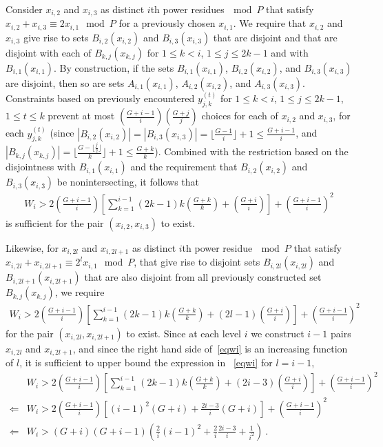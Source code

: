 \documentclass[12pt]{article} \pagestyle{plain} \topmargin
\begin{document}
Consider $x_{i,2}$ and $x_{i,3}$ as distinct $i$th power
residues$~\mod P$ that satisfy $x_{i,2}+ x_{i,3} \equiv 2x_{i,1}
\mod P$ for a previously chosen $x_{i,1}$. We require that
 $x_{i,2}$ and $x_{i,3}$ give rise to sets $B_{i,2}(x_{i,2})$ and
$B_{i,3}(x_{i,3})$ that are disjoint and that are disjoint with each
of $B_{k,j}(x_{k,j})$ for $1\leq k < i$, $1\leq j \leq 2k-1$ and
with $B_{i,1}(x_{i,1})$. By construction, if the sets
$B_{i,1}(x_{i,1})$, $B_{i,2}(x_{i,2})$, and $B_{i,3}(x_{i,3})$ are
disjoint, then so are sets $A_{i,1}(x_{i,1})$, $A_{i,2}(x_{i,2})$,
and $A_{i,3}(x_{i,3})$. Constraints based on previously encountered
$y_{j,k}^{(t)}$ for $1\leq k < i$, $1\leq j \leq 2k-1$, $1 \leq t
\leq k$ prevent at most $(\frac{G+i-1}{i})(\frac{G+j}{j})$ choices
for each of $x_{i,2}$ and $x_{i,3}$, for each $y_{j,k}^{(t)}$ (since
$|B_{i,2}(x_{i,2})|=|B_{i,3}(x_{i,3})|= \lfloor \frac{G-1}{i}
\rfloor+1 \leq \frac{G+i-1}{i}$, and $|B_{k,j}(x_{k,j})|=\lfloor
\frac{G-\lfloor \frac{j}{2}\rfloor}{k} \rfloor+1 \leq
\frac{G+k}{k}$). Combined with the restriction based on the
disjointness with $B_{i,1}(x_{i,1})$ and the requirement that
$B_{i,2}(x_{i,2})$ and $B_{i,3}(x_{i,3})$ be nonintersecting, it
follows that
\begin{equation}\begin{array}{lll} W_i>
2\left(\frac{G+i-1}{i}\right) \left[\sum_{k=1}^{i-1}
(2k-1)k(\frac{G+k}{k})+\left( \frac{G+i}{i}\right)\right]+\left(
\frac{G+i-1}{i}\right)^2
\end{array}\end{equation}
is sufficient for the pair $(x_{i,2},x_{i,3})$ to exist.

Likewise, for  $x_{i,2l}$ and $x_{i,2l+1}$ as distinct $i$th power
residue$~\mod P$ that satisfy $x_{i,2l}+ x_{i,2l+1} \equiv
2^lx_{i,1} \mod P$, that give rise to disjoint sets
$B_{i,2l}(x_{i,2l})$ and $B_{i,2l+1}(x_{i,2l+1})$ that are also
disjoint from all previously constructed set $B_{k,j}(x_{k,j})$,
we require
\begin{equation}\label{eqwi}\begin{array}{lll} W_i>
2(\frac{G+i-1}{i}) \left[\sum_{k=1}^{i-1}
(2k-1)k(\frac{G+k}{k})+(2l-1)\left(
\frac{G+i}{i}\right)\right]+\left( \frac{G+i-1}{i}\right)^2
\end{array}\end{equation}
for the pair $(x_{i,2l},x_{i,2l+1})$ to exist. Since at each level
$i$ we construct $i-1$ pairs $x_{i,2l}$ and $x_{i,2l+1}$, and since
the right hand side of~\eqref{eqwi} is an increasing function of
$l$, it is sufficient to upper bound the expression in ~\eqref{eqwi}
for $l=i-1$,
\begin{equation}\label{eqwi}\begin{array}{lll} {}&W_i>
2(\frac{G+i-1}{i}) \left[\sum_{k=1}^{i-1}
(2k-1)k(\frac{G+k}{k})+(2i-3)\left(
\frac{G+i}{i}\right)\right]+\left( \frac{G+i-1}{i}\right)^2\\
\Leftarrow & W_i > 2(\frac{G+i-1}{i}) \left[
(i-1)^2(G+i)+\frac{2i-3}{i} (G+i)\right]+\left(
\frac{G+i-1}{i}\right)^2 \\\Leftarrow & W_i > (G+i)(G+i-1) \left(
\frac{2}{i}(i-1)^2+\frac{2}{i}\frac{2i-3}{i}+\frac{1}{i^2} \right)~.
\end{array}\end{equation}
\end{document}
